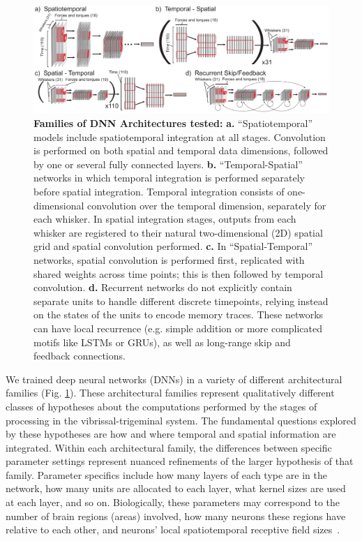\begin{figure}
\FigCenter
\includegraphics [width=\ArchiFigSize\linewidth]{figures/architectures.pdf}
\vspace{-3mm}
\caption{\footnotesize{\textbf{Families of DNN Architectures tested:} \textbf{a.} ``Spatiotemporal'' models include spatiotemporal integration at all stages. Convolution is performed on both spatial and temporal data dimensions, followed by one or several fully connected layers. \textbf{b.} ``Temporal-Spatial'' networks in which temporal integration is performed separately before spatial integration.  Temporal integration consists of one-dimensional convolution over the temporal dimension, separately for each whisker. In spatial integration stages, outputs from each whisker are registered to their natural two-dimensional (2D) spatial grid and spatial convolution performed.  \textbf{c.} In ``Spatial-Temporal'' networks, spatial convolution is performed first, replicated with shared weights across time points; this is then followed by temporal convolution. \textbf{d.} Recurrent networks do not explicitly contain separate units to handle different discrete timepoints, relying instead on the states of the units to encode memory traces.  These networks can have local recurrence (e.g. simple addition or more complicated motifs like LSTMs or GRUs), as well as long-range skip and feedback connections.}~\label{fig_archi}}
\vspace{-5mm}
\end{figure}

We trained deep neural networks (DNNs) in a variety of different architectural families (Fig. \ref{fig_archi}).  
These architectural families represent qualitatively different classes of hypotheses about the computations performed by the stages of processing in the vibrissal-trigeminal system. 
The fundamental questions explored by these hypotheses are how and where temporal and spatial information are integrated.
Within each architectural family, the differences between specific parameter settings represent nuanced refinements of the larger hypothesis of that family.   
Parameter specifics include how many layers of each type are in the network, how many units are allocated to each layer, what kernel sizes are used at each layer, and so on.  
Biologically, these parameters may correspond to the number of brain regions (areas) involved, how many neurons these regions have relative to each other, and neurons' local spatiotemporal receptive field sizes~\cite{yamins2016using}.
 
